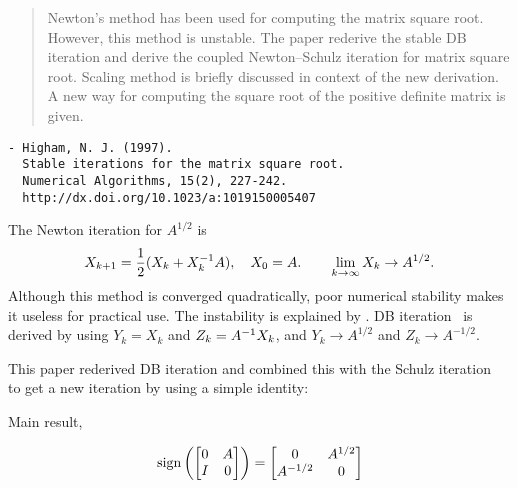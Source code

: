 \documentclass{article}
\begin{document}
\maketitle
\thispagestyle{firstpage}




\begin{abstract}
  Newton's method has been used for computing the matrix square root.
  However, this method is unstable. The paper rederive the stable DB
  iteration and derive the coupled Newton--Schulz iteration for matrix
  square root. Scaling method is briefly discussed in context of the new
  derivation. A new way for computing the square root of the positive
  definite matrix is given.
\end{abstract}

\begin{lstlisting}[language={},numbers=none]
- Higham, N. J. (1997). 
  Stable iterations for the matrix square root. 
  Numerical Algorithms, 15(2), 227-242. 
  http://dx.doi.org/10.1023/a:1019150005407 
\end{lstlisting}

The Newton iteration for $A^{1/2}$ is
\begin{equation}\notag
  X_{k + 1} = \frac{1}{2}(X_k + X_k^{-1} A), \quad X_0 = A. \qquad 
  \lim_{k \to \infty} X_k \to A^{1/2}.
\end{equation}
Although this method is converged quadratically, poor numerical stability
makes it useless for practical use. The instability is explained by
\cite{high86nwmsqrt}. DB iteration~\cite{debe76} is derived by using
$Y_k = X_k$ and $Z_k = A^{-1} X_k$, and $Y_k \to A^{1/2}$ and
$Z_k \to A^{-1/2}$.

This paper rederived DB iteration and combined this with the Schulz
iteration~\cite{schu33} to get a new iteration by using a simple
identity:

\begin{mybox}
  \begin{center}
    \sffamily Main result, \cite[Lemma~1]{high97}
  \end{center}
  \begin{equation}\notag
    \mathrm{sign}\left(
      \begin{bmatrix} 
        0 & A \\ I & 0
      \end{bmatrix}\right) = 
    \begin{bmatrix}
      0 & A^{1/2} \\ A^{-1/2} & 0 
    \end{bmatrix}
  \end{equation}
\end{mybox}
\end{document}
